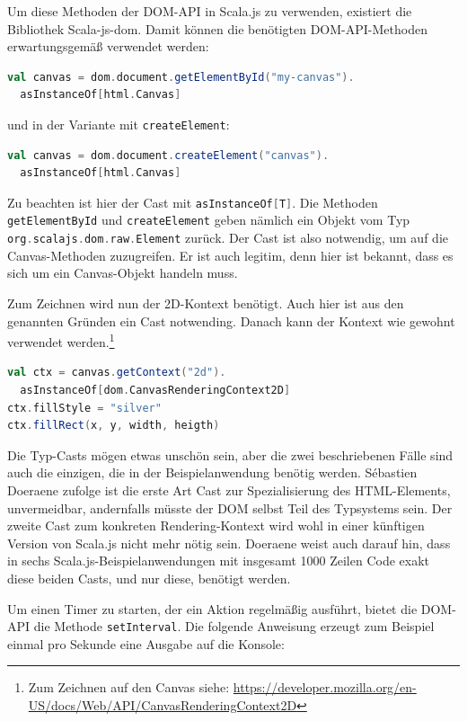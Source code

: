 \documentclass[a4paper, 12pt, hidelinks, listof=totoc, listoftables=totoc, bibliography=totoc]{scrreprt}
\newcommand{\scala}[1]{\lstinline[language=Scala, style=inline]|#1|}
\begin{document}
Um diese Methoden der \ac{DOM}-\ac{API} in Scala.js zu verwenden, existiert die Bibliothek Scala-js-dom. Damit können die benötigten \ac{DOM}-\ac{API}-Methoden erwartungsgemäß verwendet werden:

\begin{lstlisting}[language=Scala, style=snippet]
val canvas = dom.document.getElementById("my-canvas").
  asInstanceOf[html.Canvas]
\end{lstlisting}

und in der Variante mit \scala{createElement}:

\begin{lstlisting}[language=Scala, style=snippet]
val canvas = dom.document.createElement("canvas").
  asInstanceOf[html.Canvas]
\end{lstlisting}

Zu beachten ist hier der Cast mit \scala{asInstanceOf[T]}. Die Methoden \scala{getElementById} und \scala{createElement}
geben nämlich ein Objekt vom Typ \scala{org.scalajs.dom.raw.Element} zurück. Der Cast ist also notwendig, um auf die Canvas-Methoden zuzugreifen. Er ist auch legitim, denn hier ist bekannt, dass es sich um ein Canvas-Objekt handeln muss.

Zum Zeichnen wird nun der 2D-Kontext benötigt. Auch hier ist aus den genannten Gründen ein Cast notwending. Danach kann der Kontext wie gewohnt verwendet werden.\footnote{Zum Zeichnen auf den Canvas siehe: \url{https://developer.mozilla.org/en-US/docs/Web/API/CanvasRenderingContext2D}}

\begin{lstlisting}[language=Scala, style=snippet]
val ctx = canvas.getContext("2d").
  asInstanceOf[dom.CanvasRenderingContext2D]
ctx.fillStyle = "silver"
ctx.fillRect(x, y, width, heigth)
\end{lstlisting}

Die Typ-Casts mögen etwas unschön sein, aber die zwei beschriebenen Fälle sind auch die einzigen, die in der Beispielanwendung benötig werden. Sébastien Doeraene zufolge ist die erste Art Cast zur Spezialisierung des \ac{HTML}-Elements, unvermeidbar, andernfalls müsste der \ac{DOM} selbst Teil des Typsystems sein. Der zweite Cast zum konkreten Rendering-Kontext wird wohl in einer künftigen Version von Scala.js nicht mehr nötig sein. Doeraene weist auch darauf hin, dass in sechs Scala.js-Beispielanwendungen mit insgesamt 1000 Zeilen Code exakt diese beiden Casts, und nur diese, benötigt werden. \cite[S. 8]{doeraene2013.TDI}

Um einen Timer zu starten, der ein Aktion regelmäßig ausführt, bietet die \ac{DOM}-\ac{API} die Methode \scala{setInterval}. Die folgende Anweisung erzeugt zum Beispiel einmal pro Sekunde eine Ausgabe auf die Konsole:
\end{document}
